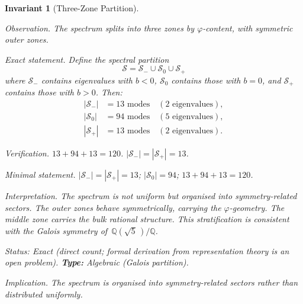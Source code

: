 \documentclass[12pt,a4paper]{article}
\newcommand{\vphi}{\varphi}
\newcommand{\Q}{\mathbb{Q}}
\newtheorem{invariant}{Invariant}
\begin{document}
\begin{invariant}[Three-Zone Partition]\label{inv:zones}

\emph{Observation.}
The spectrum splits into three zones by $\vphi$-content, with
symmetric outer zones.

\emph{Exact statement.}
Define the spectral partition
\begin{equation}\label{eq:zones}
  \mathcal{S} =
  \mathcal{S}_{-} \cup \mathcal{S}_{0} \cup \mathcal{S}_{+}
\end{equation}
where $\mathcal{S}_{-}$ contains eigenvalues with $b < 0$,
$\mathcal{S}_{0}$ contains those with $b = 0$, and
$\mathcal{S}_{+}$ contains those with $b > 0$.  Then:
\begin{align}
  |\mathcal{S}_{-}| &= 13 \text{ modes}
    \quad (2 \text{ eigenvalues}), \\
  |\mathcal{S}_{0}| &= 94 \text{ modes}
    \quad (5 \text{ eigenvalues}), \\
  |\mathcal{S}_{+}| &= 13 \text{ modes}
    \quad (2 \text{ eigenvalues}).
\end{align}

\emph{Verification.}
$13 + 94 + 13 = 120$.  $|\mathcal{S}_{-}| = |\mathcal{S}_{+}| = 13$.

\emph{Minimal statement.}
$|\mathcal{S}_{-}| = |\mathcal{S}_{+}| = 13$; \;
$|\mathcal{S}_{0}| = 94$; \; $13 + 94 + 13 = 120$.

\emph{Interpretation.}
The spectrum is not uniform but organised into symmetry-related
sectors.  The outer zones behave symmetrically, carrying the
$\vphi$-geometry.  The middle zone carries the bulk rational
structure.  This stratification is consistent with the Galois
symmetry of~$\Q(\sqrt{5}\,)/\Q$.

\emph{Status:} Exact (direct count; formal derivation from
representation theory is an open problem). \quad
\textbf{Type:} Algebraic (Galois partition).

\emph{Implication.}
The spectrum is organised into symmetry-related sectors rather
than distributed uniformly.
\end{invariant}
\end{document}
